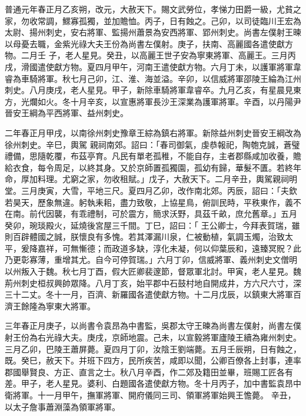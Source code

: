 
\begin{pinyinscope}

 普通元年春正月乙亥朔，改元，大赦天下。賜文武勞位，孝悌力田爵一級，尤貧之家，勿收常調，鰥寡孤獨，並加贍恤。丙子，日有蝕之。己卯，以司徒臨川王宏為太尉、揚州刺史，安右將軍、監揚州蕭景為安西將軍、郢州刺史。尚書左僕射王暕以母憂去職，金紫光祿大夫王份為尚書左僕射。庚子，扶南、高麗國各遣使獻方物。二月壬
 子，老人星見。癸丑，以高麗王世子安為寧東將軍、高麗王。三月丙戌，滑國遣使獻方物。夏四月甲午，河南王遣使獻方物。六月丁未，以護軍將軍韋睿為車騎將軍。秋七月己卯，江、淮、海並溢。辛卯，以信威將軍邵陵王綸為江州刺史。八月庚戌，老人星見。甲子，新除車騎將軍韋睿卒。九月乙亥，有星晨見東方，光爛如火。冬十月辛亥，以宣惠將軍長沙王深業為護軍將軍。辛酉，以丹陽尹晉安王綱為平西將軍、益州刺史。



 二年春正月甲戌，以南徐州刺史豫章王綜為鎮右將軍。新除益州刺史晉安王綱改為徐州刺史。辛巳，輿駕
 親祠南郊。詔曰：「春司御氣，虔恭報祀，陶匏克誠，蒼璧禮備，思隨乾覆，布茲亭育。凡民有單老孤稚，不能自存，主者郡縣咸加收養，贍給衣食，每令周足，以終其身。又於京師置孤獨園，孤幼有歸，華髮不匱。若終年命，厚加料理。尤窮之家，勿收租賦。」戊子，大赦天下。二月辛丑，輿駕親祠明堂。三月庚寅，大雪，平地三尺。夏四月乙卯，改作南北郊。丙辰，詔曰：「夫欽若昊天，歷象無違。躬執耒耜，盡力致敬，上協星鳥，俯訓民時，平秩東作，義不在南。前代因襲，有乖禮制，可於震方，簡求沃野，具茲千畝，庶允舊章。」五月癸卯，琬琰殿火，延燒後宮屋三千間。丁巳，詔曰：「
 王公卿士，今拜表賀瑞，雖則百辟體國之誠，朕懷良有多愧。若其澤漏川泉，仁被動植，氣調玉燭，治致太平，爰降嘉祥，可無慚德；而政道多缺，淳化未凝，何以仰葉辰和，遠臻冥貺？此乃更彰寡薄，重增其尤。自今可停賀瑞。」六月丁卯，信威將軍、義州刺史文僧明以州叛入于魏。秋七月丁酉，假大匠卿裴邃節，督眾軍北討。甲寅，老人星見。魏荊州刺史桓叔興帥眾降。八月丁亥，始平郡中石鼓村地自開成井，方六尺六寸，深三十二丈。冬十一月，百濟、新羅國各遣使獻方物。十二月戊辰，以鎮東大將軍百濟王餘隆為寧東大將軍。



 三年春正月庚子，以尚書令袁昂為中書監，吳郡太守王暕為尚書左僕射，尚書左僕射王份為右光祿大夫。庚戌，京師地震。己未，以宣毅將軍廬陵王續為雍州刺史。三月乙卯，巴陵王蕭屏薨。夏四月丁卯，汝陰王劉端薨。五月壬辰朔，日有蝕之，既。癸巳，赦天下。并班下四方，民所疾苦，咸即以聞，公卿百僚各上封事，連率郡國舉賢良、方正、直言之士。秋八月辛酉，作二郊及籍田並畢，班賜工匠各有差。甲子，老人星見。婆利、白題國各遣使獻方物。冬十月丙子，加中書監袁昂中衛將軍。十一月甲午，撫軍將軍、開府儀同三司、領軍將軍始興王憺薨。
 辛丑，以太子詹事蕭淵藻為領軍將軍。




\end{pinyinscope}
